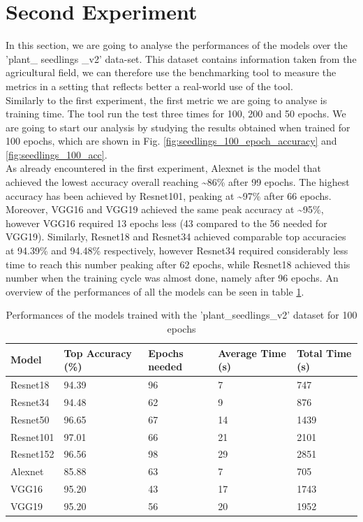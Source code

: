 \section{Second Experiment}
In this section, we are going to analyse the performances of the models over the 'plant\_ seedlings \_v2' data-set. This dataset contains information taken from the agricultural field, we can therefore use the benchmarking tool to measure the metrics in a setting that reflects better a real-world use of the tool.\\
Similarly to the first experiment, the first metric we are going to analyse is training time. The tool run the test three times for 100, 200 and 50 epochs. 
We are going to start our analysis by studying the results obtained when trained for 100 epochs, which are shown in Fig. \ref{fig:seedlings_100_epoch_accuracy} and \ref{fig:seedlings_100_acc}. \\
As already encountered in the first experiment, Alexnet is the model that achieved the lowest accuracy overall reaching \textasciitilde86\% after 99 epochs. The highest accuracy has been achieved by Resnet101, peaking at \textasciitilde97\% after 66 epochs. Moreover, VGG16 and VGG19 achieved the same peak accuracy at \textasciitilde95\%, however VGG16 required 13 epochs less (43 compared to the 56 needed for VGG19). Similarly, Resnet18 and Resnet34 achieved comparable top accuracies at  94.39\% and 94.48\% respectively, however Resnet34 required considerably less time to reach this number peaking after 62 epochs, while Resnet18 achieved this number when the training cycle was almost done, namely after 96 epochs. An overview of the performances of all the models can be seen in table \ref{tab:performances_seeds}. 
\begin{table}[htbp]
\centering
\begin{tabular}{ p{2cm} p{4cm} p{3cm} p{3cm} p{2cm}  }
 Model& Top Accuracy (\%) & Epochs needed &Average Time (s)&Total Time (s)\\
 \hline
Resnet18&94.39&96&7&747\\
Resnet34&94.48&62&9&876\\
Resnet50&96.65&67&14&1439\\
Resnet101&97.01&66&21&2101\\
Resnet152&96.56&98&29&2851\\
Alexnet&85.88&63&7&705\\
VGG16&95.20&43&17&1743\\
VGG19&95.20&56&20&1952\\
 \hline
\end{tabular}
\caption{Performances of the models trained with the 'plant\_seedlings\_v2' dataset for 100 epochs}
\label{tab:performances_seeds}
\end{table}\\




